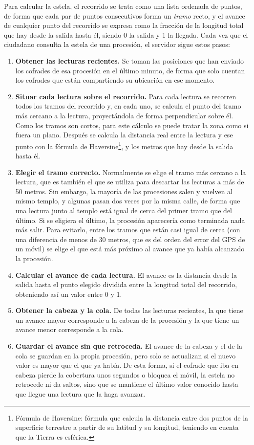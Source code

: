 Para calcular la estela, el recorrido se trata como una lista ordenada de puntos, de forma que cada par de puntos consecutivos forma un \emph{tramo} recto, y el avance de cualquier punto del recorrido se expresa como la fracción de la longitud total que hay desde la salida hasta él, siendo 0 la salida y 1 la llegada. Cada vez que el ciudadano consulta la estela de una procesión, el servidor sigue estos pasos:

\begin{enumerate}
    \item \textbf{Obtener las lecturas recientes.} Se toman las posiciones que han enviado los cofrades de esa procesión en el último minuto, de forma que solo cuentan los cofrades que están compartiendo su ubicación en ese momento.
    \item \textbf{Situar cada lectura sobre el recorrido.} Para cada lectura se recorren todos los tramos del recorrido y, en cada uno, se calcula el punto del tramo más cercano a la lectura, proyectándola de forma perpendicular sobre él. Como los tramos son cortos, para este cálculo se puede tratar la zona como si fuera un plano. Después se calcula la distancia real entre la lectura y ese punto con la fórmula de Haversine\footnote{Fórmula de Haversine: fórmula que calcula la distancia entre dos puntos de la superficie terrestre a partir de su latitud y su longitud, teniendo en cuenta que la Tierra es esférica.}, y los metros que hay desde la salida hasta él.
    \item \textbf{Elegir el tramo correcto.} Normalmente se elige el tramo más cercano a la lectura, que es también el que se utiliza para descartar las lecturas a más de 50 metros. Sin embargo, la mayoría de las procesiones salen y vuelven al mismo templo, y algunas pasan dos veces por la misma calle, de forma que una lectura junto al templo está igual de cerca del primer tramo que del último. Si se eligiera el último, la procesión aparecería como terminada nada más salir. Para evitarlo, entre los tramos que están casi igual de cerca (con una diferencia de menos de 30 metros, que es del orden del error del GPS de un móvil) se elige el que está más próximo al avance que ya había alcanzado la procesión.
    \item \textbf{Calcular el avance de cada lectura.} El avance es la distancia desde la salida hasta el punto elegido dividida entre la longitud total del recorrido, obteniendo así un valor entre 0 y 1.
    \item \textbf{Obtener la cabeza y la cola.} De todas las lecturas recientes, la que tiene un avance mayor corresponde a la cabeza de la procesión y la que tiene un avance menor corresponde a la cola.
    \item \textbf{Guardar el avance sin que retroceda.} El avance de la cabeza y el de la cola se guardan en la propia procesión, pero solo se actualizan si el nuevo valor es mayor que el que ya había. De esta forma, si el cofrade que iba en cabeza pierde la cobertura unos segundos o bloquea el móvil, la estela no retrocede ni da saltos, sino que se mantiene el último valor conocido hasta que llegue una lectura que la haga avanzar.
\end{enumerate}


